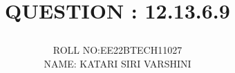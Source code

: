 \documentclass[journal,12pt,twocolumn]{IEEEtran}
\begin{document}
\let\vec\mathbf




\vspace{3cm}

\title{

\textbf{QUESTION : 12.13.6.9} 

}
\author{ ROLL NO:EE22BTECH11027\\
         NAME: KATARI SIRI VARSHINI
	}
	
	

\maketitle

\newpage


\bigskip
\end{document}
